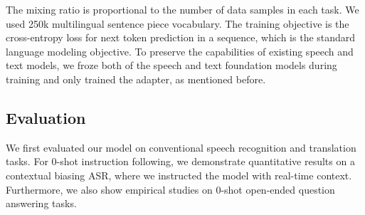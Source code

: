 The mixing ratio is proportional to the number of data samples in each task. We used 250k multilingual sentence piece vocabulary. The training objective is the cross-entropy loss for next token prediction in a sequence, which is the standard language modeling objective. To preserve the capabilities of existing speech and text models, we froze both of the speech and text foundation models during training and only trained the adapter, as mentioned before. 

\subsection{Evaluation}
\label{sec:eval}

We first evaluated our model on conventional speech recognition and translation tasks.  For 0-shot instruction following, we demonstrate quantitative results on a contextual biasing ASR, where we instructed the model with real-time context. Furthermore, we also show empirical studies on 0-shot open-ended question answering tasks. 

